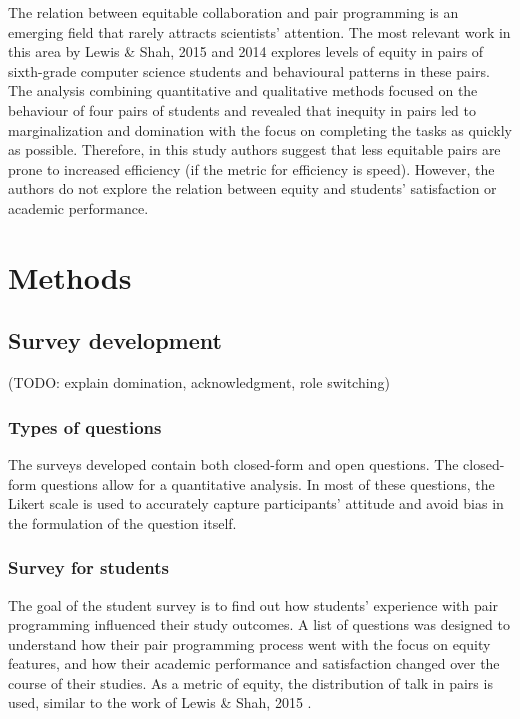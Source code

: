 \documentclass[conference]{IEEEtran}
\begin{document}
The relation between equitable collaboration and pair programming is an emerging field that rarely attracts scientists' attention. The most relevant work in this area by Lewis \& Shah, 2015 \cite{LewiShah} and 2014 \cite{ShahLewi} explores levels of equity in pairs of sixth-grade computer science students and behavioural patterns in these pairs. The analysis combining quantitative and qualitative methods focused on the behaviour of four pairs of students and revealed that inequity in pairs led to marginalization and domination with the focus on completing the tasks as quickly as possible. Therefore, in this study authors suggest that less equitable pairs are prone to increased efficiency (if the metric for efficiency is speed). However, the authors do not explore the relation between equity and students' satisfaction or academic performance. 

\section{Methods}

\subsection{Survey development}

(TODO: explain domination, acknowledgment, role switching)

\subsubsection{Types of questions}

The surveys developed contain both closed-form and open questions. The closed-form questions allow for a quantitative analysis. In most of these questions, the Likert scale \cite{Likert} is used to accurately capture participants' attitude and avoid bias in the formulation of the question itself.

\subsubsection{Survey for students}

The goal of the student survey is to find out how students' experience with pair programming influenced their study outcomes. A list of questions was designed to understand how their pair programming process went with the focus on equity features, and how their academic performance and satisfaction changed over the course of their studies. As a metric of equity, the distribution of talk in pairs is used, similar to the work of Lewis \& Shah, 2015 \cite{LewiShah}.
\end{document}
